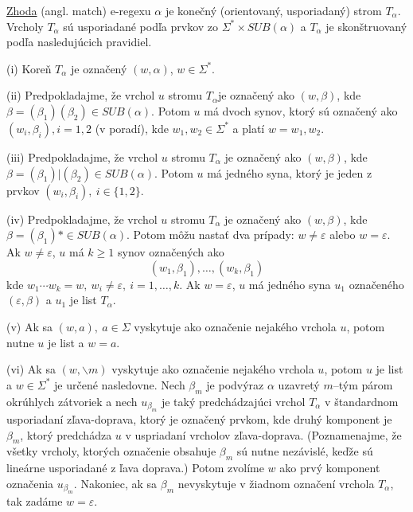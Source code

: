 \begin{df}
\underline{Zhoda} (angl. match) e-regexu $\alpha$ je konečný (orientovaný, us\-po\-ria\-da\-ný) strom $T_\alpha$. Vrcholy $T_\alpha$ sú usporiadané podľa prvkov zo $\Sigma^* \times SUB(\alpha)$ a $T_\alpha$ je skonštruovaný podľa nasledujúcich pravidiel.
\begin{list}{}{}
\item[(i)] Koreň $T_\alpha$ je označený $(w,\alpha )$, $w \in \Sigma^*$.
\item[(ii)] Predpokladajme, že vrchol $u$ stromu $T_\alpha$je označený ako $(w,\beta )$, kde $\beta = (\beta_1)(\beta_2) \in SUB(\alpha)$. Potom $u$ má dvoch synov, ktorý sú označený ako $(w_i,\beta_i), i=1,2$ (v poradí), kde $w_1,w_2 \in \Sigma^*$ a platí $w = w_1, w_2$.
\item[(iii)] Predpokladajme, že vrchol $u$ stromu $T_\alpha$ je označený ako $(w,\beta )$, kde $\beta = (\beta_1)|(\beta_2) \in SUB(\alpha)$. Potom $u$ má jedného syna, ktorý je jeden z prvkov $(w_i,\beta_i), ~ i \in \lbrace 1,2 \rbrace$.
\item[(iv)] Predpokladajme, že vrchol $u$ stromu $T_\alpha$ je označený ako $(w,\beta )$, kde $\beta = (\beta_1)* \in SUB(\alpha)$. Potom môžu nastať dva prípady: $w \neq \varepsilon$ alebo $w = \varepsilon$. Ak $w \neq \varepsilon$, $u$ má $k \geq 1$ synov označených ako
$$ (w_1,\beta_1), \ldots, (w_k,\beta_1) $$
kde $w_1 \cdots w_k = w, ~ w_i \neq \varepsilon, ~ i=1, \ldots ,k$. Ak $w = \varepsilon$, $u$ má jedného syna $u_1$ označeného $(\varepsilon , \beta )$ a $u_1$ je list $T_\alpha$.
\item[(v)] Ak sa $(w,a), ~ a\in \Sigma$ vyskytuje ako označenie nejakého vrchola $u$, potom nutne $u$ je list a $w=a$.
\item[(vi)] Ak sa $(w,\backslash m)$ vyskytuje ako označenie nejakého vrchola $u$, potom $u$ je list a $w \in \Sigma^*$ je určené nasledovne. Nech $\beta_m$ je podvýraz $\alpha$ uzavretý $m$--tým párom okrúhlych zátvoriek a nech $u_{\beta_m}$ je taký predchádzajúci vrchol $T_\alpha$ v štandardnom usporiadaní zľava-doprava, ktorý je označený prvkom, kde druhý komponent je $\beta_m $, ktorý predchádza $u$ v uspriadaní vrcholov zľava-doprava. (Poznamenajme, že všetky vrcholy, ktorých označenie obsahuje $\beta_m$ sú nutne nezávislé, keďže sú lineárne usporiadané z ľava doprava.) Potom zvolíme $w$ ako prvý komponent označenia $u_{\beta_m}$. Nakoniec, ak sa $\beta_m$ nevyskytuje v žiadnom označení vrchola $T_\alpha$, tak zadáme $w = \varepsilon$.
\end{list}
\end{df}

